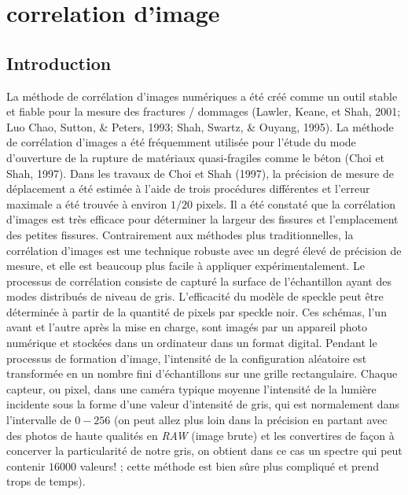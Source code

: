 \documentclass[12pt]{report}
\begin{document}
\chapter{correlation d'image}
\section{Introduction}
La méthode de corrélation d'images numériques a été créé comme un outil stable et fiable pour la
mesure des fractures / dommages (Lawler, Keane, et Shah, 2001; Luo Chao, Sutton, & Peters,
1993; Shah, Swartz, & Ouyang, 1995). La méthode de corrélation d'images a été fréquemment
utilisée pour l'étude du mode d'ouverture de la rupture de matériaux quasi-fragiles comme le
béton (Choi et Shah, 1997). Dans les travaux de Choi et Shah (1997), la précision de mesure de
déplacement a été estimée à l'aide de trois procédures différentes et l'erreur maximale a été
trouvée à environ $1/20$ pixels. Il a été constaté que la corrélation d'images est très efficace pour
déterminer la largeur des fissures et l'emplacement des petites fissures.
Contrairement aux méthodes plus traditionnelles, la corrélation d'images est une
technique robuste avec un degré élevé de précision de mesure, et elle est beaucoup plus facile à
appliquer expérimentalement. Le processus de corrélation consiste de capturé la surface de
l'échantillon ayant des modes distribués de niveau de gris. L'efficacité du modèle de speckle peut
être déterminée à partir de la quantité de pixels par speckle noir. Ces schémas, l'un avant et
l'autre après la mise en charge, sont imagés par un appareil photo numérique et stockées dans un
ordinateur dans un format digital. Pendant le processus de formation d'image, l'intensité de la
configuration aléatoire est transformée en un nombre fini d'échantillons sur une grille
rectangulaire. Chaque capteur, ou pixel, dans une caméra typique moyenne l'intensité de la
lumière incidente sous la forme d'une valeur d'intensité de gris, qui est normalement dans
l'intervalle de $0-256$ (on peut allez plus loin dans la précision en partant avec des photos de haute qualités en \emph{RAW} (image brute) et les convertires de façon à concerver la particularité de notre gris, on obtient dans ce cas un spectre qui peut contenir $16000$ valeurs! ; cette méthode est bien sûre plus compliqué et prend trops de temps).
\end{document}

